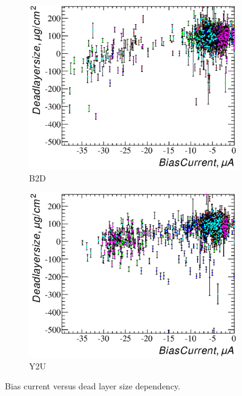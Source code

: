 \documentclass[a4paper,12pt]{article}
\begin{document}
\newcommand\bcvsxdllabel{Bias current versus dead layer size dependency.}
\begin{figure}
\begin{subfigure}[t]{0.5\textwidth}
\includegraphics[width=\textwidth]{gfx/run13_alpha_study/B2D/c_hBiasCurrent_DeadLayerSize.eps}
\caption{B2D}
\end{subfigure}
%
\begin{subfigure}[t]{0.5\textwidth}
\includegraphics[width=\textwidth]{gfx/run13_alpha_study/Y2U/c_hBiasCurrent_DeadLayerSize.eps}
\caption{Y2U}
\end{subfigure}
\caption{\bcvsxdllabel{}}
\label{fig:bc_vs_xdl}
\end{figure}
\end{document}
